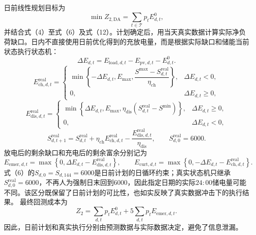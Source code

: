 \documentclass{cumcmthesis}
\newcommand{\Tset}{\mathcal{T}}
\begin{document}
日前线性规划目标为
\begin{equation}
\min Z_{2,\mathrm{DA}}=\sum_{t\in\Tset}p_tE^0_{d,t},
\tag{13}
\end{equation}
并结合式（4）至式（6）及式（12）。计划确定后，用当天真实数据计算实际净负荷缺口。日内不直接使用日前优化得到的充放电量，而是根据实际缺口和储能当前状态执行状态机：
\begin{equation}
\Delta E_{d,t}=E_{\mathrm{load},d,t}-E_{\mathrm{pv},d,t}-E^0_{d,t}.
\tag{14}
\end{equation}
\begin{equation}
E_{\mathrm{ch},d,t}^{\mathrm{real}}=
\begin{cases}
\min\left\{-\Delta E_{d,t},E_{\max},
\dfrac{S^{\max}-S_{d,t}^{\mathrm{real}}}{\eta_{\mathrm{ch}}}\right\},&\Delta E_{d,t}<0,\\
0,&\Delta E_{d,t}\geq0,
\end{cases}
\tag{14a}
\end{equation}
\begin{equation}
E_{\mathrm{dis},d,t}^{\mathrm{real}}=
\begin{cases}
\min\left\{\Delta E_{d,t},E_{\max},
\eta_{\mathrm{dis}}(S_{d,t}^{\mathrm{real}}-S^{\min})\right\},&\Delta E_{d,t}\geq0,\\
0,&\Delta E_{d,t}<0,
\end{cases}
\tag{14b}
\end{equation}
\begin{equation}
S_{d,t+1}^{\mathrm{real}}=S_{d,t}^{\mathrm{real}}+\eta_{\mathrm{ch}}E_{\mathrm{ch},d,t}^{\mathrm{real}}
-\frac{E_{\mathrm{dis},d,t}^{\mathrm{real}}}{\eta_{\mathrm{dis}}},\qquad S_{d,0}^{\mathrm{real}}=6000.
\tag{14c}
\end{equation}
放电后的剩余缺口和充电后的剩余富余分别记为
\begin{equation}
E_{\mathrm{emer},d,t}=\max\left\{0,\Delta E_{d,t}-E_{\mathrm{dis},d,t}^{\mathrm{real}}\right\},\qquad
E_{\mathrm{curt},d,t}=\max\left\{0,-\Delta E_{d,t}-E_{\mathrm{ch},d,t}^{\mathrm{real}}\right\}.
\tag{14d}
\end{equation}
式（6）的$S_{d,0}=S_{d,144}=6000$是日前计划的日循环约束；真实状态机只继承$S_{d,0}^{\mathrm{real}}=6000$，不再人为强制日末回到6000，因此指定日期的实际$24{:}00$储电量可能不同。该区分既保留了日前计划的可比性，也如实反映了真实数据冲击下的执行结果。
最终回测成本为
\begin{equation}
Z_2=\sum_{d,t}p_tE^0_{d,t}+5\sum_{d,t}p_tE_{\mathrm{emer},d,t}.
\tag{15}
\end{equation}
因此，日前计划和真实执行分别由预测数据与实际数据决定，避免了信息泄漏。
\end{document}
